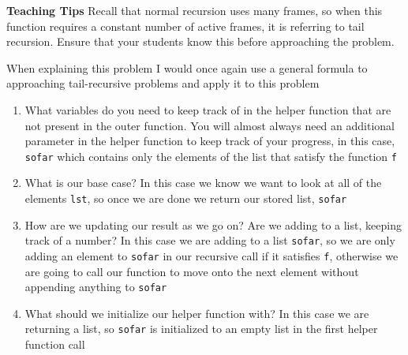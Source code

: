 \begin{guide}
\begin{blocksection}
\textbf{Teaching Tips}
  Recall that normal recursion uses many frames, so when this function requires a constant number of active frames, it is referring to tail recursion. Ensure that your students know this before approaching the problem.

  When explaining this problem I would once again use a general formula to approaching tail-recursive problems and apply it to this problem
  \begin{enumerate}
    \item What variables do you need to keep track of in the helper function that are not present in the outer function. You will almost always need an additional parameter in the helper function to keep track of your progress, in this case, \lstinline{sofar} which contains only the elements of the list that satisfy the function \lstinline{f}
    \item What is our base case? In this case we know we want to look at all of the elements \lstinline{lst}, so once we are done we return our stored list, \lstinline{sofar}
    \item How are we updating our result as we go on? Are we adding to a list, keeping track of a number? In this case we are adding to a list \lstinline{sofar}, so we are only adding an element to \lstinline{sofar} in our recursive call if it satisfies \lstinline{f}, otherwise we are going to call our function to move onto the next element without appending anything to \lstinline{sofar}
    \item What should we initialize our helper function with? In this case we are returning a list, so \lstinline{sofar} is initialized to an empty list in the first helper function call
    
  \end{enumerate}
\end{blocksection}
\end{guide}
